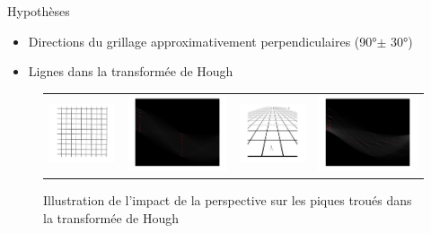 \begin{frame}{Hypothèses}
\begin{itemize}
	\item Directions du grillage approximativement perpendiculaires (90°$\pm$ 30°)
	\item Lignes dans la transformée de Hough	
\end{itemize}
\begin{figure}[t]
\begin{center}
\begin{tabular}{cccc}
\includegraphics[width = 0.23 \columnwidth]{fig/grillagereduit.png} &
\includegraphics[width = 0.23 \columnwidth]{fig/grillagehough.png}
&
\includegraphics[width = 0.23 \columnwidth]{fig/perspectivereduit.png}
& \includegraphics[width = 0.23 \columnwidth]{fig/perspectivehough.png}
\end{tabular}
\caption{\label{houghlines} Illustration de l'impact de la perspective sur les piques troués dans la transformée de Hough}
\end{center}
\end{figure}
\end{frame}

